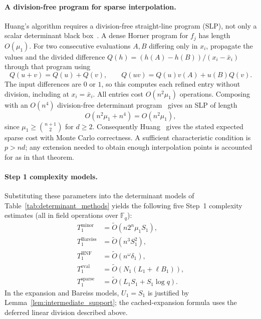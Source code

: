 \paragraph{A division-free program for sparse interpolation.}
Huang's algorithm requires a division-free straight-line program (SLP), not only a scalar determinant black box~\cite[Definition~2 and Algorithm~9]{DBLP:journals/jsc/Huang23}.
A dense Horner program for $f_j$ has length $O(\mu_1)$. For two consecutive evaluations $A,B$ differing only in $x_i$, propagate the values and the divided difference $Q(h)=(h(A)-h(B))/(x_i-\bar x_i)$ through that program using
\[
 Q(u+v)=Q(u)+Q(v),\qquad
 Q(uv)=Q(u)v(A)+u(B)Q(v).
\]
The input differences are $0$ or $1$, so this computes each refined entry without division, including at $x_i=\bar x_i$. All entries cost $O(n^2\mu_1)$ operations. Composing with an $O(n^4)$ division-free determinant program~\cite{Rote2001DivisionFree} gives an SLP of length
\[
 O(n^2\mu_1+n^4)=O(n^2\mu_1),
\]
since $\mu_1\ge\binom{n+1}{2}$ for $d\ge2$.
Consequently Huang~\cite[Theorem~12]{DBLP:journals/jsc/Huang23} gives the stated expected sparse cost with Monte Carlo correctness. A sufficient characteristic condition is $p>nd$; any extension needed to obtain enough interpolation points is accounted for as in that theorem.

\paragraph{Step 1 complexity models.}
Substituting these parameters into the determinant models of Table~\ref{tab:determinant_methods} yields the following five Step~1 complexity estimates (all in field operations over $\mathbb{F}_q$):
\begin{align*}
	T_{1}^{\mathrm{minor}} &= \widetilde{O}(n2^n\mu_1S_1),\\
	T_{1}^{\mathrm{Bareiss}} &= \widetilde{O}(n^3S_1^2),\\
	T_{1}^{\mathrm{HNF}} &= \widetilde{O}(n^{\omega}\delta_1),\\
	T_{1}^{\mathrm{eval}} &= \widetilde{O}\!\left(N_1(L_1+\ell B_1)\right),\\
	T_{1}^{\mathrm{sparse}} &= \widetilde{O}(L_1S_1 + S_1\log q).
\end{align*}
In the expansion and Bareiss models, $U_1=S_1$ is justified by Lemma~\ref{lem:intermediate_support}; the cached-expansion formula uses the deferred linear division described above.


